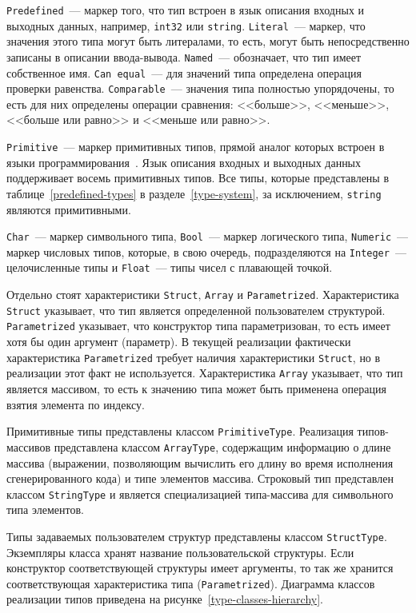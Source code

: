 \documentclass[times,specification,annotation]{style/itmo-student-thesis/itmo-student-thesis}
\begin{document}
\texttt{Predefined}~--- маркер того, что тип встроен в язык описания входных и выходных данных, например, \texttt{int32} или \texttt{string}. \texttt{Literal}~--- маркер, что значения этого типа могут быть литералами, то есть, могут быть непосредственно записаны в описании ввода-вывода. \texttt{Named}~--- обозначает, что тип имеет собственное имя. \texttt{Can equal}~--- для значений типа определена операция проверки равенства. \texttt{Comparable}~--- значения типа полностью упорядочены, то есть для них определены операции сравнения: <<больше>>, <<меньше>>, <<больше или равно>> и <<меньше или равно>>.

\texttt{Primitive}~--- маркер примитивных типов, прямой аналог которых встроен в языки программирования~\cite{stone1987program}. Язык описания входных и выходных данных поддерживает восемь примитивных типов. Все типы, которые представлены в таблице~\ref{predefined-types} в разделе~\ref{type-system}, за исключением, \texttt{string} являются примитивными.

\texttt{Char}~--- маркер символьного типа, \texttt{Bool}~--- маркер логического типа, \texttt{Numeric}~--- маркер числовых типов, которые, в свою очередь, подразделяются на \texttt{Integer}~--- целочисленные типы и \texttt{Float}~--- типы чисел с плавающей точкой. 

Отдельно стоят характеристики \texttt{Struct}, \texttt{Array} и \texttt{Parametrized}. Характеристика \texttt{Struct} указывает, что тип является определенной пользователем структурой. \texttt{Parametrized} указывает, что конструктор типа параметризован, то есть имеет хотя бы один аргумент (параметр). В текущей реализации фактически характеристика \texttt{Parametrized} требует наличия характеристики \texttt{Struct}, но в реализации этот факт не используется. Характеристика \texttt{Array} указывает, что тип является массивом, то есть к значению типа может быть применена операция взятия элемента по индексу.

Примитивные типы представлены классом \texttt{PrimitiveType}. Реализация типов-массивов представлена классом \texttt{ArrayType}, содержащим информацию о длине массива (выражении, позволяющим вычислить его длину во время исполнения сгенерированного кода) и типе элементов массива. Строковый тип представлен классом \texttt{StringType} и является специализацией типа-массива для символьного типа элементов.

Типы задаваемых пользователем структур представлены классом \texttt{StructType}. Экземпляры класса хранят название пользовательской структуры. Если конструктор соответствующей структуры имеет аргументы, то так же хранится соответствующая характеристика типа (\texttt{Parametrized}). Диаграмма классов реализации типов приведена на рисунке~\ref{type-classes-hierarchy}.
\end{document}
